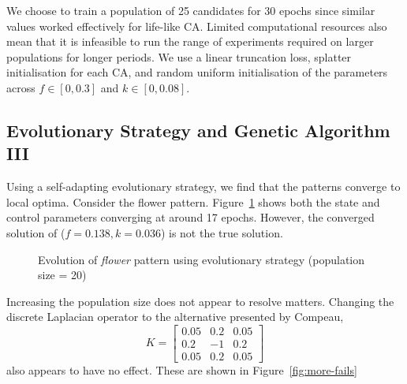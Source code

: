 We choose to train a population of 25 candidates for 30 epochs since similar values worked effectively for life-like CA. Limited computational resources also mean that it is infeasible to run the range of experiments required on larger populations for longer periods. We use a linear truncation loss, splatter initialisation for each CA, and random uniform initialisation of the parameters across $f \in [0, 0.3]$ and $k \in [0, 0.08]$.

\subsection{Evolutionary Strategy and Genetic Algorithm III}

Using a self-adapting evolutionary strategy, we find that the patterns converge to local optima. Consider the flower pattern. Figure~\ref{fig:flower-fail} shows both the state and control parameters converging at around 17 epochs. However, the converged solution of ($f = 0.138, k = 0.036$) is not the true solution.\\

\begin{figure}[!h]
\centering
            \hfill
            \hfill
            \hfill
            \hfill
            \caption{Evolution of \textit{flower} pattern using evolutionary strategy (population size = 20)}
\label{fig:flower-fail}
\end{figure}

Increasing the population size does not appear to resolve matters. Changing the discrete Laplacian operator to the alternative presented by Compeau\cite{compeau},
\[
  K= \begin{bmatrix}
    0.05 & 0.2 & 0.05\\
    0.2 & -1 & 0.2\\
    0.05 & 0.2 & 0.05
  \end{bmatrix}
\]
also appears to have no effect. These are shown in Figure~\ref{fig:more-fails}\\


